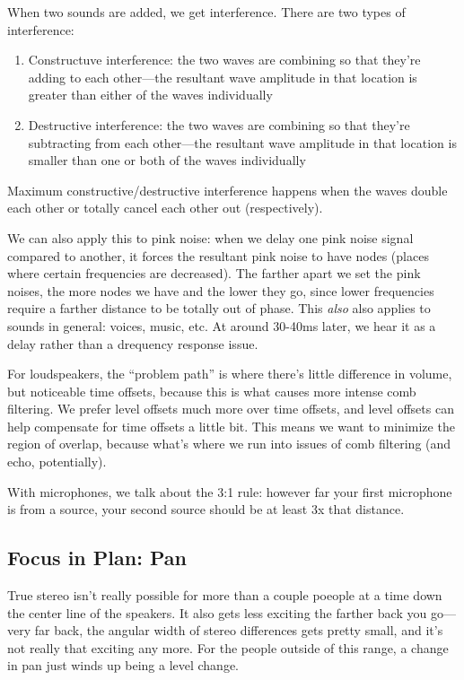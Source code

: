\documentclass[a4paper]{article}
\begin{document}
When two sounds are added, we get interference. There are two types of
interference:
\begin{enumerate}
	\item Constructuve interference: the two waves are combining so that
		they're adding to each other---the resultant wave amplitude 
		in that location is greater than either of the waves
		individually
	\item Destructive interference: the two waves are combining so that
		they're subtracting from each other---the resultant wave
		amplitude in that location is smaller than one or both of the
		waves individually
\end{enumerate}
Maximum constructive/destructive interference happens when the waves double
each other or totally cancel each other out (respectively).

We can also apply this to pink noise: when we delay one pink noise signal
compared to another, it forces the resultant pink noise to have nodes (places
where certain frequencies are decreased). The farther apart we set the pink
noises, the more nodes we have and the lower they go, since lower frequencies
require a farther distance to be totally out of phase. This \emph{also} also
applies to sounds in general: voices, music, etc. At around 30-40ms later, we
hear it as a delay rather than a drequency response issue.

For loudspeakers, the ``problem path'' is where there's little difference in
volume, but noticeable time offsets, because this is what causes more intense
comb filtering. We prefer level offsets much more over time offsets, and level
offsets can help compensate for time offsets a little bit. This means we want
to minimize the region of overlap, because what's where we run into issues of
comb filtering (and echo, potentially).

With microphones, we talk about the 3:1 rule: however far your first
microphone is from a source, your second source should be at least 3x that
distance.

\subsection{Focus in Plan: Pan}

True stereo isn't really possible for more than a couple poeople at a time down
the center line of the speakers. It also gets less exciting the farther back
you go---very far back, the angular width of stereo differences gets pretty
small, and it's not really that exciting any more. For the people outside of
this range, a change in pan just winds up being a level change.
\end{document}
